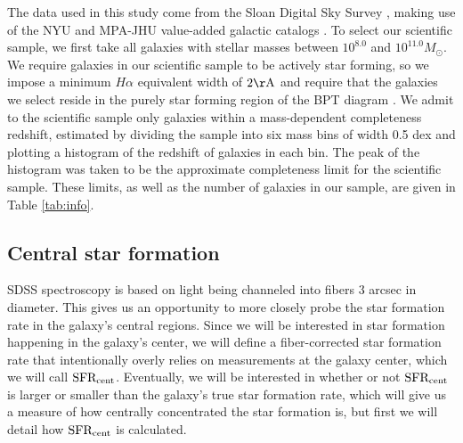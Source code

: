 \documentclass[iop]{emulateapj}
\begin{document}
The data used in this study come from the Sloan Digital Sky Survey \citep[SDSS,][]{SDSS}, making use of the NYU and MPA-JHU value-added galactic catalogs \citep{Kauffmann03,Brinchmann04,blanton05vagc}. To select our scientific sample, we first take all galaxies with stellar masses between $10^{8.0}$ and $10^{11.0} M_{\odot}$. We require galaxies in our scientific sample to be actively star forming, so we impose a minimum $H\alpha$ equivalent width of $2 \rm \AA$ and require that the galaxies we select reside in the purely star forming region of the BPT diagram \citep{BPT}. We admit to the scientific sample only galaxies within a mass-dependent completeness redshift, estimated by dividing the sample into six mass bins of width 0.5 dex and plotting a histogram of the redshift of galaxies in each bin. The peak of the histogram was taken to be the approximate completeness limit for the scientific sample. These limits, as well as the number of galaxies in our sample, are given in Table \ref{tab:info}.


\subsection{Central star formation}
\label{sec:fibercor}
SDSS spectroscopy is based on light being channeled into fibers $3$ arcsec in diameter. This gives us an opportunity to more closely probe the star formation rate in the galaxy's central regions. Since we will be interested in star formation happening in the galaxy's center, we will define a fiber-corrected star formation rate that intentionally overly relies on measurements at the galaxy center, which we will call $\rm SFR_{cent}$. Eventually, we will be interested in whether or not $\rm SFR_{cent}$ is larger or smaller than the galaxy's true star formation rate, which will give us a measure of how centrally concentrated the star formation is, but first we will detail how $\rm SFR_{cent}$ is calculated.
\end{document}
